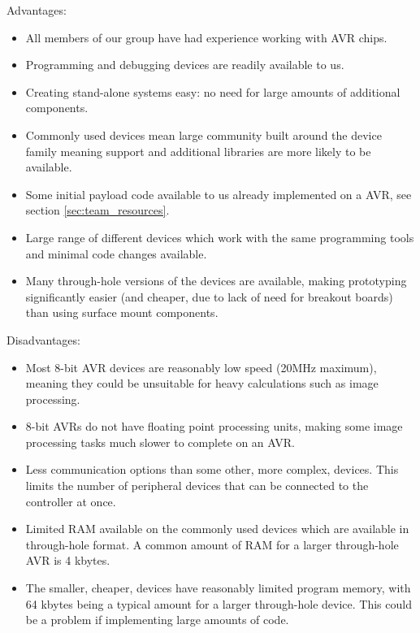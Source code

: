 Advantages:
\begin{itemize}
\item All members of our group have had experience working with AVR chips.

\item Programming and debugging devices are readily available to us.

\item Creating stand-alone systems easy: no need for large amounts of additional components.

\item Commonly used devices mean large community built around the device family meaning support and additional libraries are more likely to be available.

\item Some initial payload code available to us already implemented on a AVR, see section \ref{sec:team_resources}.

\item Large range of different devices which work with the same programming tools and minimal code changes available.

\item Many through-hole versions of the devices are available, making prototyping significantly easier (and cheaper, due to lack of need for breakout boards) than using surface mount components.
\end{itemize}

Disadvantages:
\begin{itemize}
\item Most 8-bit AVR devices are reasonably low speed (20MHz maximum), meaning they could be unsuitable for heavy calculations such as image processing.

\item 8-bit AVRs do not have floating point processing units, making some image processing tasks much slower to complete on an AVR.

\item Less communication options than some other, more complex, devices. This limits the number of peripheral devices that can be connected to the controller at once.

\item Limited RAM available on the commonly used devices which are available in through-hole format. A common amount of RAM for a larger through-hole AVR is 4 kbytes.

\item The smaller, cheaper, devices have reasonably limited program memory, with 64 kbytes being a typical amount for a larger through-hole device. This could be a problem if implementing large amounts of code.
\end{itemize}
	
